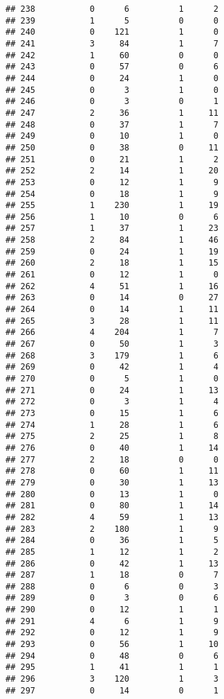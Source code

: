 \documentclass[]{article}
\begin{document}
\begin{verbatim}
## 238           0      6          1      2
## 239           1      5          0      0
## 240           0    121          1      0
## 241           3     84          1      7
## 242           1     60          0      0
## 243           0     57          0      6
## 244           0     24          1      0
## 245           0      3          1      0
## 246           0      3          0      1
## 247           2     36          1     11
## 248           0     37          1      7
## 249           0     10          1      0
## 250           0     38          0     11
## 251           0     21          1      2
## 252           2     14          1     20
## 253           0     12          1      9
## 254           0     18          1      9
## 255           1    230          1     19
## 256           1     10          0      6
## 257           1     37          1     23
## 258           2     84          1     46
## 259           0     24          1     19
## 260           2     18          1     15
## 261           0     12          1      0
## 262           4     51          1     16
## 263           0     14          0     27
## 264           0     14          1     11
## 265           3     28          1     11
## 266           4    204          1      7
## 267           0     50          1      3
## 268           3    179          1      6
## 269           0     42          1      4
## 270           0      5          1      0
## 271           0     24          1     13
## 272           0      3          1      4
## 273           0     15          1      6
## 274           1     28          1      6
## 275           2     25          1      8
## 276           0     40          1     14
## 277           2     18          0      0
## 278           0     60          1     11
## 279           0     30          1     13
## 280           0     13          1      0
## 281           0     80          1     14
## 282           4     59          1     13
## 283           2    180          1      9
## 284           0     36          1      5
## 285           1     12          1      2
## 286           0     42          1     13
## 287           1     18          0      7
## 288           0      6          0      3
## 289           0      3          0      6
## 290           0     12          1      1
## 291           4      6          1      9
## 292           0     12          1      9
## 293           0     56          1     10
## 294           0     48          0      6
## 295           1     41          1      1
## 296           3    120          1      3
## 297           0     14          0      1

\end{verbatim}
\end{document}
